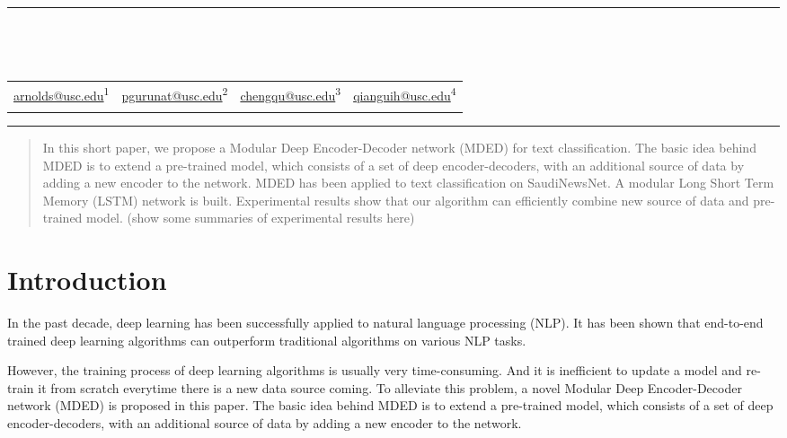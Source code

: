 \documentclass[12pt]{article}
\makeatletter
\newcommand\Mark[1]{\textsuperscript#1}
\def\maketitle{
	\par\rule{\textwidth}{2pt}
	\par\hfill
	\begin{centering}
	\begingroup
	\centering
	{\par\textbf{\LARGE\@title}\\[1.5em]
	\large\par{\textit{\@author}}}\\[1em]
	\begin{tabular}{*{4}{>{\centering}p{.23\textwidth}}}
	\url{arnolds@usc.edu}\Mark{1} & \url{pgurunat@usc.edu}\Mark{2} & \url{chengqu@usc.edu}\Mark{3} & \url{qianguih@usc.edu}\Mark{4} \tabularnewline
	9013085897 & 2251924199 & 9532576000 & 2385279985
	\end{tabular}\par
	\endgroup
	\par\rule{\textwidth}{2pt}
	\end{centering}
}
\makeatother
\begin{document}
\thispagestyle{empty}
\maketitle
\hfill
\begin{abstract}

In this short paper, we propose a Modular Deep Encoder-Decoder network (MDED) for text classification. The basic idea behind MDED is to extend a pre-trained model, which consists of a set of deep encoder-decoders, with an additional source of data by adding a new encoder to the network. MDED has been applied to text classification on SaudiNewsNet. A modular Long Short Term Memory (LSTM) network is built. Experimental results show that our algorithm can efficiently combine new source of data and pre-trained model. (show some summaries of experimental results here)

\end{abstract}

\section{Introduction}\label{introduction}


In the past decade, deep learning has been successfully applied to natural language processing (NLP). It has been shown that end-to-end trained deep learning algorithms can outperform traditional algorithms on various NLP tasks.


However, the training process of deep learning algorithms is usually very time-consuming. And it is inefficient to update a model and re-train it from scratch everytime there is a new data source coming. To alleviate this problem, a novel Modular Deep Encoder-Decoder network (MDED) is proposed in this paper. The basic idea behind MDED is to extend a pre-trained model, which consists of a set of deep encoder-decoders, with an additional source of data by adding a new encoder to the network. 
\end{document}
